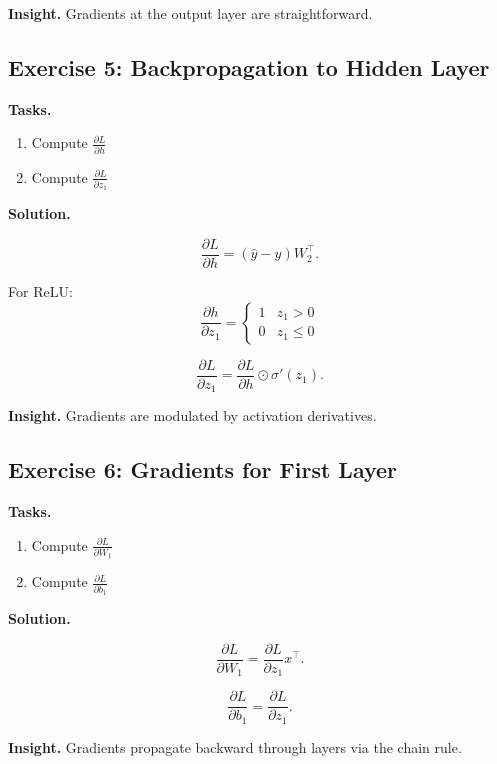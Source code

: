 \noindent
\textbf{Insight.}  
Gradients at the output layer are straightforward.

\subsection{Exercise 5: Backpropagation to Hidden Layer}

\textbf{Tasks.}
\begin{enumerate}
    \item Compute $\frac{\partial L}{\partial h}$
    \item Compute $\frac{\partial L}{\partial z_1}$
\end{enumerate}

\medskip

\noindent
\textbf{Solution.}

\[
\frac{\partial L}{\partial h} = (\hat{y} - y) W_2^\top.
\]

\medskip

\noindent
For ReLU:
\[
\frac{\partial h}{\partial z_1} =
\begin{cases}
1 & z_1 > 0 \\
0 & z_1 \leq 0
\end{cases}
\]

\[
\frac{\partial L}{\partial z_1} =
\frac{\partial L}{\partial h} \odot \sigma'(z_1).
\]

\medskip

\noindent
\textbf{Insight.}  
Gradients are modulated by activation derivatives.

\subsection{Exercise 6: Gradients for First Layer}

\textbf{Tasks.}
\begin{enumerate}
    \item Compute $\frac{\partial L}{\partial W_1}$
    \item Compute $\frac{\partial L}{\partial b_1}$
\end{enumerate}

\medskip

\noindent
\textbf{Solution.}

\[
\frac{\partial L}{\partial W_1} =
\frac{\partial L}{\partial z_1} x^\top.
\]

\[
\frac{\partial L}{\partial b_1} =
\frac{\partial L}{\partial z_1}.
\]

\medskip

\noindent
\textbf{Insight.}  
Gradients propagate backward through layers via the chain rule.

